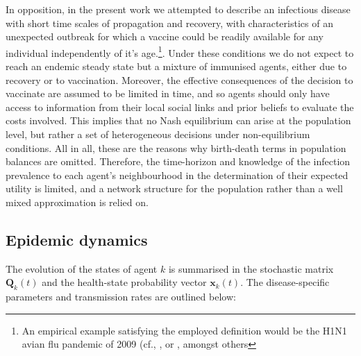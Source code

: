 \documentclass[11pt]{article}
\begin{document}
In opposition, in the present work we attempted to describe an infectious disease with short time scales of propagation and recovery, with characteristics of an unexpected outbreak for which a vaccine could be readily available for any individual independently of it's age.\footnote{An empirical example satisfying the employed definition would be the H1N1 avian flu pandemic of 2009 (cf.\cite{hancock2009}, \cite{neumann2009}, or \cite{smith2009}, amongst others}. Under these conditions we do not expect to reach an endemic steady state but a mixture of immunised agents, either due to recovery or to vaccination. Moreover, the effective consequences of the decision to vaccinate are assumed to be limited in time, and so agents should only have access to information from their local social links and prior beliefs to evaluate the costs involved. This implies that no Nash equilibrium can arise at the population level, but rather a set of heterogeneous decisions under non-equilibrium conditions. All in all, these are the reasons why birth-death terms in population balances are omitted. Therefore, the time-horizon and knowledge of the infection prevalence to each agent's neighbourhood in the determination of their expected utility is limited, and  a network structure for the population rather than a well mixed approximation is relied on. 

\subsection{Epidemic dynamics}

The evolution of the states of agent \(k\) is summarised in the stochastic matrix \(\mathbf{Q}_k(t)\) and the health-state probability vector \(\mathbf{x}_k(t)\). The disease-specific parameters and transmission rates are outlined below:
\end{document}
